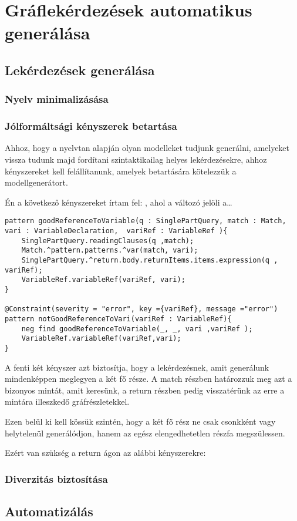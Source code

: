 \chapter{Gráflekérdezések automatikus generálása}
\section{Lekérdezések generálása}

\subsection{Nyelv minimalizásása}
\subsection{Jólformáltsági kényszerek betartása}
Ahhoz, hogy a nyelvtan alapján olyan modelleket tudjunk generálni, amelyeket vissza tudunk majd fordítani szintaktikailag helyes lekérdezésekre, ahhoz kényszereket kell felállítanunk, amelyek betartására kötelezzük a modellgenerátort.


Én a következő kényszereket írtam fel:
, ahol a  változó jelöli a\ldots

\begin{lstlisting}[style=viatrasmall]
pattern goodReferenceToVariable(q : SinglePartQuery, match : Match, vari : VariableDeclaration,  variRef : VariableRef ){	
	SinglePartQuery.readingClauses(q ,match);
	Match.^pattern.patterns.^var(match, vari);
	SinglePartQuery.^return.body.returnItems.items.expression(q , variRef);
	VariableRef.variableRef(variRef, vari);
}	

@Constraint(severity = "error", key ={variRef}, message ="error")
pattern notGoodReferenceToVari(variRef : VariableRef){
	neg find goodReferenceToVariable(_, _, vari ,variRef );
	VariableRef.variableRef(variRef,vari);
}

\end{lstlisting}


A fenti két kényszer azt biztosítja, hogy a lekérdezésnek, amit generálunk mindenképpen meglegyen a két fő része. A match részben határozzuk meg azt a bizonyos mintát, amit keresünk, a return részben pedig visszatérünk az erre a mintára illeszkedő gráfrészletekkel.

Ezen belül ki kell kössük szintén, hogy a két fő rész ne csak csonkként vagy helytelenül generálódjon, hanem az egész elengedhetetlen részfa megszülessen.

Ezért van szükség a return ágon az alábbi kényszerekre:



\subsection{Diverzitás biztosítása}


\section{Automatizálás}


